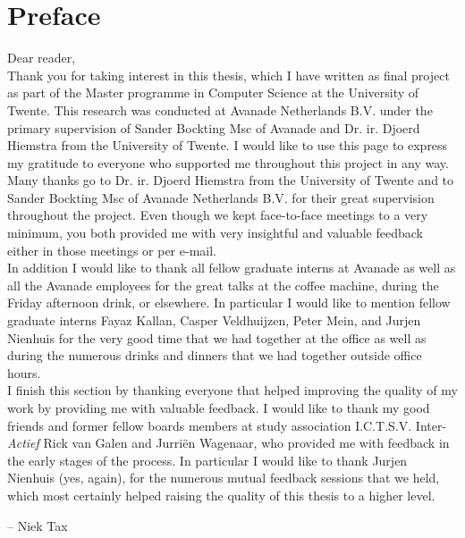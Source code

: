 
\bigskip

\begingroup
\let\clearpage\relax
\let\cleardoublepage\relax
\let\cleardoublepage\relax
\chapter*{Preface}
Dear reader,\\

Thank you for taking interest in this thesis, which I have written as final project as part of the Master programme in Computer Science at the University of Twente. This research was conducted at Avanade Netherlands B.V. under the primary supervision of Sander Bockting Msc of Avanade and Dr. ir. Djoerd Hiemstra from the University of Twente. I would like to use this page to express my gratitude to everyone who supported me throughout this project in any way.\\

Many thanks go to Dr. ir. Djoerd Hiemstra from the University of Twente and to Sander Bockting Msc of Avanade Netherlands B.V. for their great supervision throughout the project. Even though we kept face-to-face meetings to a very minimum, you both provided me with very insightful and valuable feedback either in those meetings or per e-mail.\\

In addition I would like to thank all fellow graduate interns at Avanade as well as all the Avanade employees for the great talks at the coffee machine, during the Friday afternoon drink, or elsewhere. In particular I would like to mention fellow graduate interns Fayaz Kallan, Casper Veldhuijzen, Peter Mein, and Jurjen Nienhuis for the very good time that we had together at the office as well as during the numerous drinks and dinners that we had together outside office hours.\\

I finish this section by thanking everyone that helped improving the quality of my work by providing me with valuable feedback. I would like to thank my good friends and former fellow boards members at study association I.C.T.S.V. Inter-\emph{Actief} Rick van Galen and Jurri\"{e}n Wagenaar, who provided me with feedback in the early stages of the process. In particular I would like to thank Jurjen Nienhuis (yes, again), for the numerous mutual feedback sessions that we held, which most certainly helped raising the quality of this thesis to a higher level.\\
\bigskip

-- Niek Tax

\endgroup



